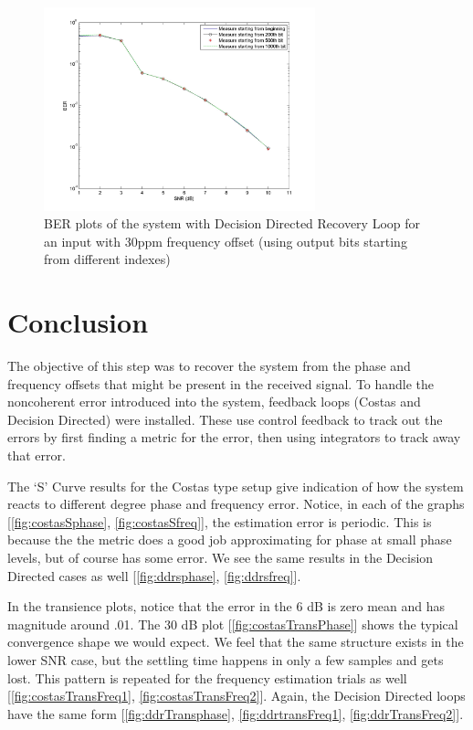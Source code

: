 \documentclass[]{article}
\begin{document}
\begin{figure}[H]
\centering
\hspace*{-2cm}\includegraphics[width=0.7\textwidth]{qpBERfo_ddr2.jpg}
\caption{BER plots of the system with Decision Directed Recovery Loop for an input with 30ppm frequency offset (using output bits starting from different indexes) \label{fig:ddrBERFreq2}}
\end{figure}

\newpage
\section{Conclusion}
\label{sec:conc}

The objective of this step was to recover the system from the phase and frequency offsets that might be present in the received signal. To handle the noncoherent error introduced into the system, feedback loops (Costas and Decision Directed) were installed. These use control feedback to track out the errors by first finding a metric for the error, then using integrators to track away that error. 

The `S' Curve results for the Costas type setup give indication of how the system reacts to different degree phase and frequency error.  Notice, in each of the graphs [\ref{fig:costasSphase}, \ref{fig:costasSfreq}], the estimation error is periodic.  This is because the the metric does a good job approximating for phase at small phase levels, but of course has some error.  We see the same results in the Decision Directed cases as well [\ref{fig:ddrsphase}, \ref{fig:ddrsfreq}].

In the transience plots, notice that the error in the 6 dB is zero mean and has magnitude around .01.  The 30 dB plot [\ref{fig:costasTransPhase}]  shows the typical convergence shape we would expect.  We feel that the same structure exists in the lower SNR case, but the settling time happens in only a few samples and gets lost.  This pattern is repeated for the frequency estimation trials as well [\ref{fig:costasTransFreq1}, \ref{fig:costasTransFreq2}].  Again, the Decision Directed loops have the same form [\ref{fig:ddrTransphase}, \ref{fig:ddrtransFreq1}, \ref{fig:ddrTransFreq2}].
\end{document}
